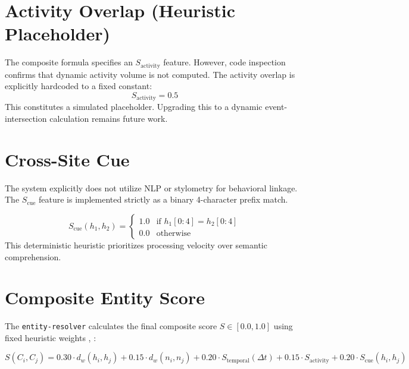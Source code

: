 \section{Activity Overlap (Heuristic Placeholder)}
\label{sec:meth-activity}
The composite formula specifies an $S_{\text{activity}}$ feature. However, code inspection confirms 
that dynamic activity volume is not computed. The activity overlap is explicitly hardcoded to 
a fixed constant:
\begin{equation}
S_{\text{activity}} = 0.5
\label{eq:activity}
\end{equation}
This constitutes a simulated placeholder. Upgrading this to a dynamic event-intersection calculation 
remains future work.

\section{Cross-Site Cue}
\label{sec:meth-cross-site}
The system explicitly does not utilize NLP or stylometry for behavioral linkage. The $S_{\text{cue}}$ 
feature is implemented strictly as a binary 4-character prefix match. 

\begin{equation}
S_{\text{cue}}(h_1, h_2) = \begin{cases} 
1.0 & \text{if } h_1[0:4] = h_2[0:4] \\
0.0 & \text{otherwise}
\end{cases}
\label{eq:crosssite}
\end{equation}
This deterministic heuristic prioritizes processing velocity over semantic comprehension.

\section{Composite Entity Score}
\label{sec:meth-composite}
The \texttt{entity-resolver} calculates the final composite score $S \in [0.0, 1.0]$ using fixed 
heuristic weights \cite{fellegi1969theory}, \cite{christen2012data}:

\begin{equation}
S(C_i, C_j) = 0.30 \cdot d_w(h_i, h_j) + 0.15 \cdot d_w(n_i, n_j) + 0.20 \cdot S_{\text{temporal}}(\Delta t) + 0.15 \cdot S_{\text{activity}} + 0.20 \cdot S_{\text{cue}}(h_i, h_j)
\label{eq:composite}
\end{equation}

